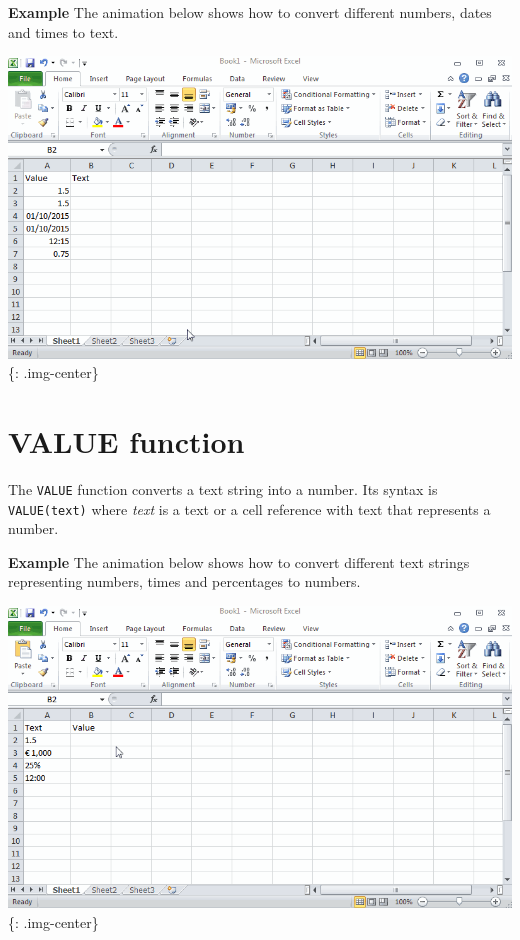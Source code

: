 \textbf{Example} The animation below shows how to convert different numbers, dates and times to text.

\includegraphics[keepaspectratio,width=\textwidth,height=0.75\textheight]{img/example_function_text.gif}
\{: .img-center\}

\section{VALUE function}
\label{valuefunction}

The \texttt{VALUE} function converts a text string into a number. Its syntax is \texttt{VALUE(text)} where \emph{text} is a text or a cell reference with text that represents a number.

\textbf{Example} The animation below shows how to convert different text strings representing numbers, times and percentages to numbers.

\includegraphics[keepaspectratio,width=\textwidth,height=0.75\textheight]{img/example_function_value.gif}
\{: .img-center\}

